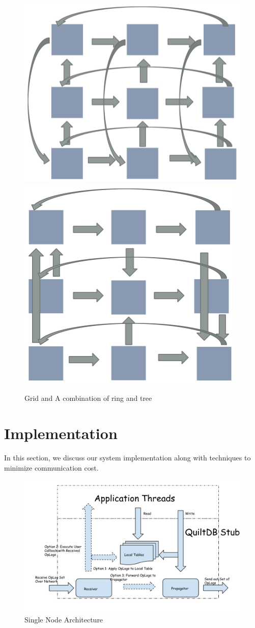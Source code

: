 \documentclass[11pt, twocolumn]{article}
\begin{document}
\begin{figure}[th!]
  \centering
  \includegraphics[width=.4\textwidth]{fig/ring_ring}
  \hspace{4ex}
  \includegraphics[width=.4\textwidth]{fig/ring_tree}
  \caption{Grid and A combination of ring and tree}
  \label{fig:topo2}
\end{figure}

\section{Implementation}
In this section, we discuss our system implementation along with techniques to
minimize communication cost.

\begin{figure}[th!]
  \centering
  \includegraphics[width=.8\textwidth]{fig/propagator-receiver.pdf}
  \caption{Single Node Architecture}
  \label{fig:prop-recv}
\end{figure}
\end{document}
